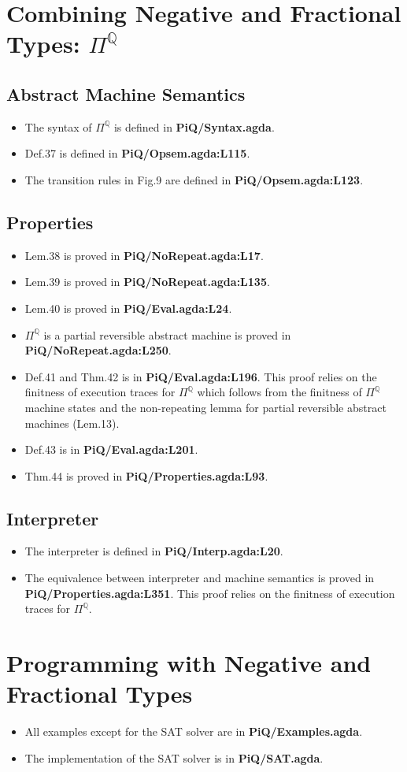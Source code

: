 \documentclass{article}
\begin{document}
\section{Combining Negative and Fractional Types: $\Pi^{\mathbb{Q}}$}
\subsection{Abstract Machine Semantics}
\begin{itemize}
\item The syntax of $\Pi^{\mathbb{Q}}$ is defined in \textbf{PiQ/Syntax.agda}.
\item Def.37 is defined in \textbf{PiQ/Opsem.agda:L115}.
\item The transition rules in Fig.9 are defined in \textbf{PiQ/Opsem.agda:L123}.
\end{itemize}

\subsection{Properties}
\begin{itemize}
\item Lem.38 is proved in \textbf{PiQ/NoRepeat.agda:L17}.
\item Lem.39 is proved in \textbf{PiQ/NoRepeat.agda:L135}.
\item Lem.40 is proved in \textbf{PiQ/Eval.agda:L24}.
\item $\Pi^{\mathbb{Q}}$ is a partial reversible abstract machine is proved in \textbf{PiQ/NoRepeat.agda:L250}.
\item Def.41 and Thm.42 is in \textbf{PiQ/Eval.agda:L196}. This proof relies on the finitness of execution traces
  for $\Pi^{\mathbb{Q}}$ which follows from the finitness of
  $\Pi^{\mathbb{Q}}$ machine states and the non-repeating lemma for partial
  reversible abstract machines (Lem.13).
\item Def.43 is in \textbf{PiQ/Eval.agda:L201}.
\item Thm.44 is proved in \textbf{PiQ/Properties.agda:L93}.
\end{itemize}

\subsection{Interpreter}
\begin{itemize}
\item The interpreter is defined in \textbf{PiQ/Interp.agda:L20}.
\item The equivalence between interpreter and machine semantics is proved in \textbf{PiQ/Properties.agda:L351}.
  This proof relies on the finitness of execution traces for $\Pi^{\mathbb{Q}}$.
\end{itemize}

\section{Programming with Negative and Fractional Types}
\begin{itemize}
\item All examples except for the SAT solver are in \textbf{PiQ/Examples.agda}.
\item The implementation of the SAT solver is in \textbf{PiQ/SAT.agda}.
\end{itemize}
\end{document}
